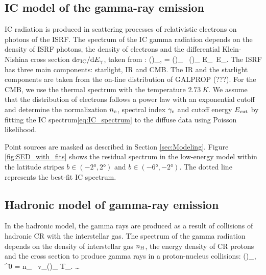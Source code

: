 \subsection{IC model of the gamma-ray emission}
\label{sec:IC_model}

IC radiation is produced in scattering processes of relativistic electrons on photons of the ISRF. The spectrum of the IC gamma radiation depends on the density of ISRF photons, the density of electrons and the differential Klein-Nishina cross section $\text{d} \sigma_{\text{IC}} / \text{d} E_\gamma$, taken from \citep{1970RvMP...42..237B}:
\be
\left(\right)_{\!\!\gamma,\IC}\! = \int\!\! \int \left(\right)_{\!\!\ISRF} \ \left(\right)_{\!\!\el} \de E_\ISRF\, \de E_\el.
\label{eq:IC_spectrum}
\ee
The ISRF has three main components: starlight, IR and CMB. 
The IR and the starlight components are taken from the on-line distribution of GALPROP (???). 
For the CMB, we use the thermal spectrum with the temperature $\SI{2.73}{K}$. 
We assume that the distribution of electrons follows a power law with an exponential cutoff
and determine the normalization $n_{\text{e}}$, spectral index $\gamma_{\text{e}}$ and cutoff energy $E_{\text{cut}}$  by fitting the IC spectrum\eqref{eq:IC_spectrum} to the diffuse \Fermi data using Poisson likelihood. 


Point sources are masked as described in Section \ref{sec:Modeling}. Figure \ref{fig:SED_with_fits} shows the residual spectrum in the low-energy model within the latitude stripes $b \in (-\ang{2}, \ang{2})$ and $b \in (-\ang{6}, -\ang{2})$. The dotted line represents the best-fit IC spectrum.





\subsection{Hadronic model of gamma-ray emission}
\label{sec:Pion_model}

In the hadronic model, the gamma rays are produced as a result of collisions of hadronic CR with the interstellar gas.
The spectrum of the gamma radiation depends on the density of interstellar gas $n_{\text{H}}$, the energy density of CR protons and the cross section to produce gamma rays in a proton-nucleus collisions:
\be
\left(\right)_{\!\!\gamma, \pi^0}\! = \int n_\Hy\  v_\pr \left(\right)_{\!\!\pr} \de T_\pr.
\ee
\dots